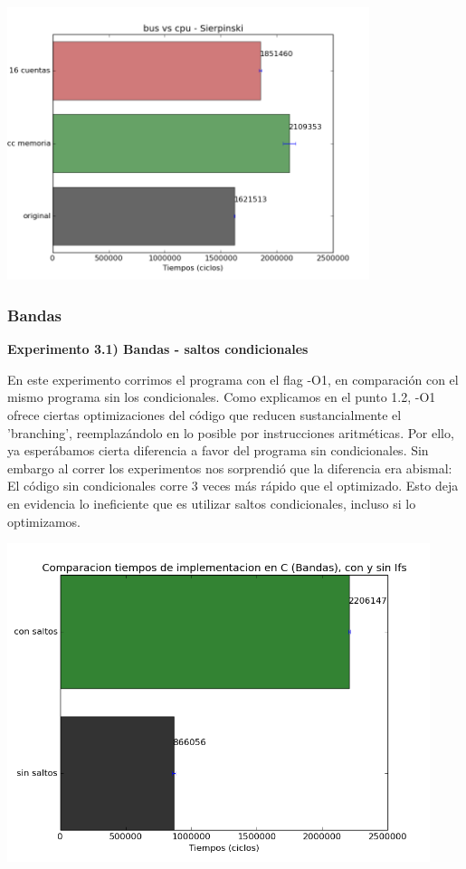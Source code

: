 \documentclass[a4paper]{article}
\begin{document}
\includegraphics[width=300pt]{imagenes/bvmsierp.png}

\newpage

\subsubsection{Bandas}

\textbf{Experimento 3.1) Bandas - saltos condicionales}

En este experimento corrimos el programa con el flag -O1, en comparaci\'{o}n con el mismo programa sin los condicionales. Como explicamos en el punto 1.2, -O1 ofrece ciertas optimizaciones del c\'{o}digo que reducen sustancialmente el 'branching', reemplaz\'{a}ndolo en lo posible por instrucciones aritm\'{e}ticas. Por ello, ya esper\'{a}bamos cierta diferencia a favor del programa sin condicionales. Sin embargo al correr los experimentos nos sorprendi\'{o} que la diferencia era abismal: El c\'{o}digo sin condicionales corre 3 veces m\'{a}s r\'{a}pido que el optimizado. Esto deja en evidencia lo ineficiente que es utilizar saltos condicionales, incluso si lo optimizamos.

\includegraphics[width=350pt]{imagenes/cmpIFS.png}
\end{document}
